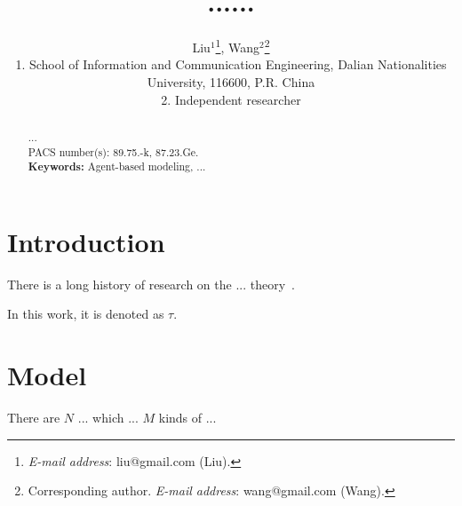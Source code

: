 \documentclass[12pt, a4paper]{article}%
\begin{document}
\newcommand{\lr}[1]{\langle #1 \rangle}
\newcommand{\llr}[1]{\langle \hspace{-2.5pt} \langle #1 \rangle \hspace{-2.5pt} \rangle}
\begin{CJK}{UTF8}{gbsn}

\title{......}%
\author{
Liu$^{1}$\footnote{\emph{E-mail address}: liu@gmail.com (Liu).},
Wang$^{2}$\footnote{Corresponding author. \emph{E-mail address}: wang@gmail.com (Wang).}
\\{\scriptsize{1. School of Information and Communication Engineering, Dalian Nationalities University, 116600, P.R.
China}}
\vspace{-3mm} \\{\scriptsize{2. Independent researcher}} } \date{} \maketitle \vspace{-10mm}

\begin{abstract}
...
\\[5pt]PACS number(s): 89.75.-k, 87.23.Ge.
\\[5pt]{\bf Keywords:} Agent-based modeling, ...
\end{abstract}%

\section{Introduction}%

There is a long history of research on the ... theory~\citep{Boccaletti2006, Liu2010}.

In this work, it is denoted as $\tau$.


\section{Model}%

There are $N$ ... which ... $M$ kinds of ...


\end{CJK}
\end{document}
